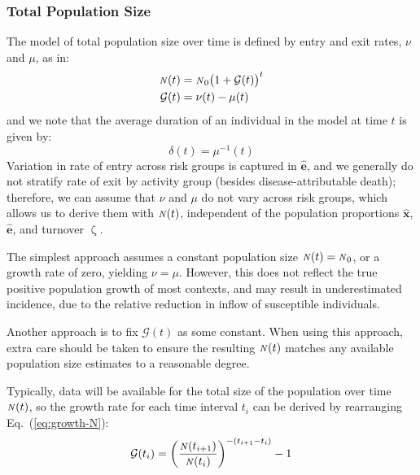 \documentclass[10pt]{article}
\numberwithin{equation}{section}
\renewcommand{\zeta}{\upzeta}
\newcommand{\N}{{\mbox{\footnotesize{\textit{N}}}}}
\newcommand{\eq}[1]{Eq.~(\ref{#1})}
\begin{document}
\subsubsection{Total Population Size}\label{sss:params-nu-mu}
%  
The model of total population size over time is defined by
entry and exit rates, $\nu$ and $\mu$, as in:
\begin{subequations}
  \begin{align}
  \N(t) &= \N_0 {\big(1+\mathcal{G}(t)\big)}^{t} \label{eq:growth-N}\\
  \mathcal{G}(t) &= \nu(t) - \mu(t)              \label{eq:growth-G}
  \end{align}
\end{subequations}
and we note that the average duration of an individual in the model at time $t$
is given by:
\begin{equation} \label{eq:duration-model}
  \delta(t) = \mu^{-1}(t)
\end{equation}
Variation in rate of entry across risk groups is captured in $\bm{\hat{e}}$,
and we generally do not stratify rate of exit by activity group
(besides disease-attributable death);
therefore, we can assume that $\nu$ and $\mu$ do not vary across risk groups,
which allows us to derive them with $\N(t)$, independent of
the population proportions $\bm{\hat{x}}$, $\bm{\hat{e}}$, and turnover $\zeta$.
\par
The simplest approach assumes a constant population size $\N(t) = \N_0$,
or a growth rate of zero, yielding $\nu = \mu$.
However, this does not reflect the true positive population growth of most contexts,
and may result in underestimated incidence,
due to the relative reduction in inflow of susceptible individuals.
\par
Another approach is to fix $\mathcal{G}(t)$ as some constant.
When using this approach, extra care should be taken to ensure
the resulting $\N(t)$ matches any available population size estimates to a reasonable degree.
\par
Typically, data will be available for the total size of the population over time $\N(t)$,
so the growth rate for each time interval $t_i$
can be derived by rearranging \eq{eq:growth-N}:
\begin{equation}
\mathcal{G}(t_i) = {\left(\frac{\N(t_{i+1})}{\N(t_{i})}\right)}^{-(t_{i+1}-t_i)} - 1
\end{equation}
\end{document}
